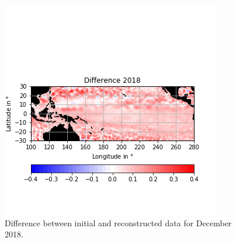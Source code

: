 \documentclass{article}
\begin{document}
\begin{figure}[b!]
\centering
\includegraphics[width=1.0\linewidth]{difference.png}
\caption{Difference between initial and reconstructed data for December 2018. }
\label{fig:diff}
\end{figure}
\end{document}
